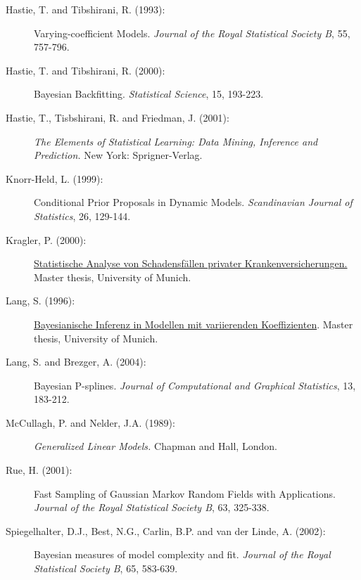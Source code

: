 \begin{description}
\item[Hastie, T. and Tibshirani, R. (1993):] Varying-coefficient Models.
{\em Journal of the Royal Statistical Society B}, 55, 757-796.

\item[Hastie, T. and Tibshirani, R. (2000):] Bayesian Backfitting. {\em Statistical Science}, 15, 193-223.

\item[Hastie, T., Tisbshirani, R. and Friedman, J. (2001):] {\em The Elements of Statistical Learning: Data Mining,
Inference and Prediction.} New York: Sprigner-Verlag.

\item[Knorr-Held, L. (1999):]
Conditional Prior Proposals in Dynamic Models. {\em Scandinavian
Journal of Statistics}, 26, 129-144.

\item[Kragler, P. (2000):] \href{http://www.scor.fr/us/2_laureat.asp?pays=2}
{Statistische Analyse von Schadensf\"allen privater
Krankenversicherungen.} Master thesis, University of Munich.


\item[Lang, S. (1996):]
\href{mailto:lang@stat.uni-muenchen.de} {Bayesianische Inferenz in
Modellen mit variierenden Koeffizienten}. Master thesis, University of Munich.


\item[Lang, S. and Brezger, A. (2004):]
Bayesian P-splines. {\em Journal of Computational and Graphical Statistics}, 13, 183-212.

\item[McCullagh, P. and Nelder, J.A. (1989):] {\em Generalized Linear Models.} Chapman and Hall, London.

\item[Rue, H. (2001):] Fast Sampling of Gaussian Markov Random Fields with Applications.
{\em Journal of the Royal Statistical Society B}, 63, 325-338.

\item[Spiegelhalter, D.J., Best, N.G., Carlin, B.P. and van der Linde, A. (2002):]
Bayesian measures of model complexity and fit. {\em Journal of the
Royal Statistical Society B}, 65, 583-639.

\end{description}

